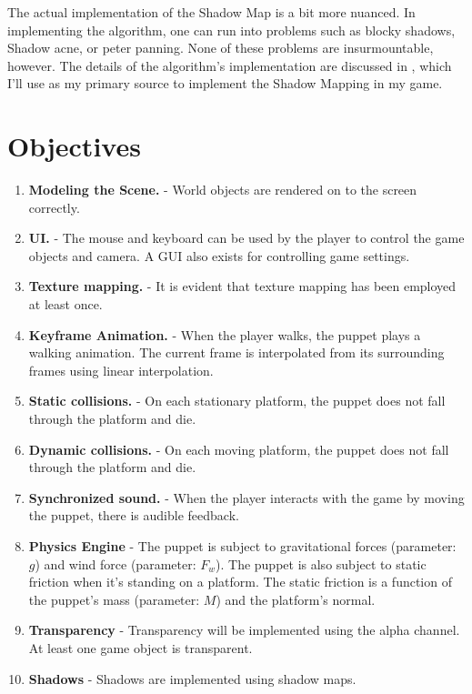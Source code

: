 \documentclass[11pt]{article}
\begin{document}
The actual implementation of the Shadow Map is a bit more nuanced. In implementing the algorithm, one can run into problems such as blocky shadows, Shadow acne, or peter panning. None of these problems are insurmountable, however. The details of the algorithm's implementation are discussed in \cite{shadow-map-learn-opengl}, which I'll use as my primary source to implement the Shadow Mapping in my game.

\printbibliography
\section{Objectives}
\begin{enumerate}
\item \textbf{Modeling the Scene.} - World objects are rendered on to the screen correctly.
\item \textbf{UI.} - The mouse and keyboard can be used by the player to control the game objects and camera. A GUI also exists for controlling game settings.
\item \textbf{Texture mapping.} - It is evident that texture mapping has been employed at least once.
\item \textbf{Keyframe Animation.} - When the player walks, the puppet plays a walking animation. The current frame is interpolated from its surrounding frames using linear interpolation.
\item \textbf{Static collisions.} - On each stationary platform, the puppet does not fall through the platform and die.
\item \textbf{Dynamic collisions.} - On each moving platform, the puppet does not fall through the platform and die.
\item \textbf{Synchronized sound.} - When the player interacts with the game by moving the puppet, there is audible feedback.
\item \textbf{Physics Engine} - The puppet is subject to gravitational forces (parameter: $g$) and wind force (parameter: $F_w$). The puppet is also subject to static friction when it's standing on a platform. The static friction is a function of the puppet's mass (parameter: $M$) and the platform's normal.
\item \textbf{Transparency} - Transparency will be implemented using the alpha channel. At least one game object is transparent.
\item \textbf{Shadows} - Shadows are implemented using shadow maps.
\end{enumerate}
\end{document}
